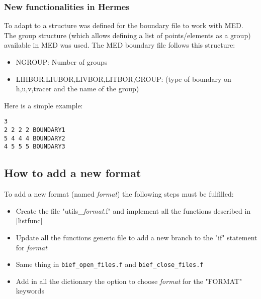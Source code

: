 \subsubsection{New functionalities in Hermes}
%
To adapt to \telemacsystem a structure was defined for the boundary file to work with
MED. The group structure (which allows defining a list of points/elements as a
group) available in MED was used. The MED boundary file follows this structure:
\begin{itemize}
\item NGROUP: Number of groups
\item LIHBOR,LIUBOR,LIVBOR,LITBOR,GROUP: (type of boundary on h,u,v,tracer and
the name of the group)
\end{itemize}
%
Here is a simple example:
\begin{verbatim}
3
2 2 2 2 BOUNDARY1
5 4 4 4 BOUNDARY2
4 5 5 5 BOUNDARY3
\end{verbatim}

%
\subsection{How to add a new format}
%
To add a new format (named \textit{format}) the following steps must be fulfilled:
\begin{itemize}
\item Create the file "utils\_\textit{format}.f" and implement all the functions
described in \ref{listfunc}
\item Update all the functions generic file to add a new branch to the "if"
statement for \textit{format}
\item Same thing in \verb!bief_open_files.f! and \verb!bief_close_files.f!
\item Add in all the dictionary the option to choose \textit{format} for the
"FORMAT" keywords
\end{itemize}

%
